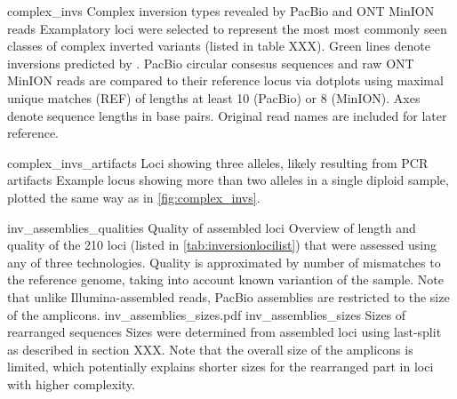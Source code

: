 \begin{table}[ht]
\begin{adjustbox}{inner,minipage=[b]{\textplusmargin}}
            \hspace{0.04\textplusmargin}
            \begin{minipage}[t]{0.42\textplusmargin}
                \centering
            \end{minipage}
        \end{adjustbox}
\end{table}





    {complex_invs}
    {Complex inversion types revealed by PacBio and ONT MinION reads}
    {Examplatory loci were selected to represent the most most commonly seen
    classes of complex inverted variants (listed in table XXX).
    Green lines denote inversions predicted by \delly. PacBio circular
    consesus sequences and raw ONT MinION reads are compared to their reference
    locus via dotplots using maximal unique matches (REF) of
    lengths at least 10 (PacBio) or 8 (MinION). Axes denote sequence lengths in
    base pairs. Original read names are included for later reference.}

    {complex_invs_artifacts}
    {Loci showing three alleles, likely resulting from PCR artifacts}
    {Example locus showing more than two alleles in a single diploid sample,
    plotted the same way as in \cref{fig:complex_invs}.}



    {inv_assemblies_qualities}
    {Quality of assembled loci}
    {Overview of length and quality of the 210 loci (listed in
    \cref{tab:inversionlocilist}) that were assessed using
    any of three technologies. Quality is approximated by number of mismatches
    to the reference genome, taking into account known variantion of the sample.
    Note that unlike Illumina-assembled reads, PacBio assemblies are restricted
    to the size of the amplicons.}
        {inv_assemblies_sizes.pdf}
    {inv_assemblies_sizes}
    {Sizes of rearranged sequences}
    {Sizes were determined from assembled loci using \acs{last}-split as
    described in section XXX. Note that the overall size of the amplicons is
    limited, which potentially explains shorter sizes for the rearranged part in
    loci with higher complexity.}

